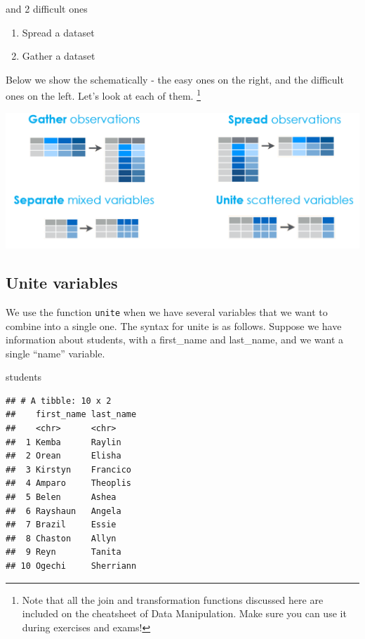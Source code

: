 \documentclass[]{tufte-book}
\newenvironment{Shaded}{}{}
\newcommand{\NormalTok}[1]{#1}
\providecommand{\tightlist}{%
  \setlength{\itemsep}{0pt}\setlength{\parskip}{0pt}}
\begin{document}
and 2 difficult ones

\begin{enumerate}
\def\labelenumi{\arabic{enumi}.}
\setcounter{enumi}{2}
\tightlist
\item
  Spread a dataset
\item
  Gather a dataset
\end{enumerate}

Below we show the schematically - the easy ones on the right, and the difficult ones on the left. Let's look at each of them. \footnote{Note that all the join and transformation functions discussed here are included on the cheatsheet of Data Manipulation. Make sure you can use it during exercises and exams!}

\includegraphics[width=1\linewidth]{images/operations2}

\hypertarget{unite-variables}{%
\subsection{Unite variables}\label{unite-variables}}

We use the function \texttt{unite} when we have several variables that we want to combine into a single one. The syntax for unite is as follows. Suppose we have information about students, with a first\_name and last\_name, and we want a single ``name'' variable.

\begin{Shaded}
\begin{Highlighting}[]
\NormalTok{students}
\end{Highlighting}
\end{Shaded}

\begin{verbatim}
## # A tibble: 10 x 2
##    first_name last_name
##    <chr>      <chr>    
##  1 Kemba      Raylin   
##  2 Orean      Elisha   
##  3 Kirstyn    Francico 
##  4 Amparo     Theoplis 
##  5 Belen      Ashea    
##  6 Rayshaun   Angela   
##  7 Brazil     Essie    
##  8 Chaston    Allyn    
##  9 Reyn       Tanita   
## 10 Ogechi     Sherriann
\end{verbatim}
\end{document}
